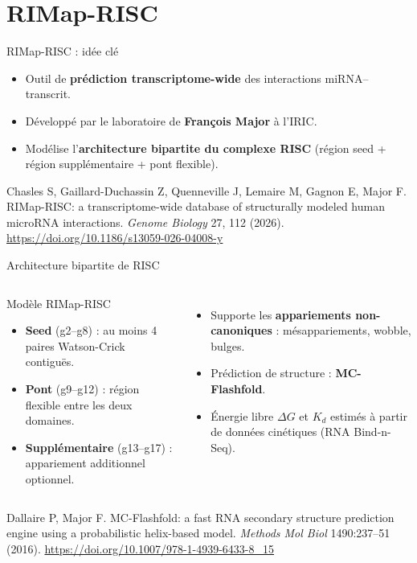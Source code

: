 \section{RIMap-RISC}

\begin{frame}{RIMap-RISC : idée clé}
  \vspace{2cm}
\begin{center}
\begin{minipage}{0.85\textwidth}
\begin{itemize}
	\item Outil de \textbf{prédiction transcriptome-wide} des interactions miRNA--transcrit.
	\item Développé par le laboratoire de \textbf{François Major} à l'IRIC.
	\item Modélise l'\textbf{architecture bipartite du complexe RISC}
	      (région seed + région supplémentaire + pont flexible).
\end{itemize}
\end{minipage}
\end{center}
\vfill
\scriptsize Chasles S, Gaillard-Duchassin Z, Quenneville J, Lemaire M, Gagnon E, Major F. RIMap-RISC: a transcriptome-wide database of structurally modeled human microRNA interactions. \textit{Genome Biology} 27, 112 (2026). \url{https://doi.org/10.1186/s13059-026-04008-y}
\end{frame}

\begin{frame}{Architecture bipartite de RISC}
\begin{columns}[T, onlytextwidth]
	\begin{block}{Modèle RIMap-RISC}
		\begin{itemize}
			\item \textbf{Seed} (g2--g8) : au moins 4 paires Watson-Crick contiguës.
			\item \textbf{Pont} (g9--g12) : région flexible entre les deux domaines.
			\item \textbf{Supplémentaire} (g13--g17) : appariement additionnel optionnel.
		\end{itemize}
	\end{block}

	\vspace{0.5em}
	\begin{itemize}
		\item Supporte les \textbf{appariements non-canoniques} : mésappariements, wobble, bulges.
		\item Prédiction de structure : \textbf{MC-Flashfold}.
		\item Énergie libre $\Delta G$ et $K_d$ estimés à partir de données cinétiques (RNA Bind-n-Seq).
	\end{itemize}
\end{columns}
\vfill
\scriptsize Dallaire P, Major F. MC-Flashfold: a fast RNA secondary structure prediction engine using a probabilistic helix-based model. \textit{Methods Mol Biol} 1490:237--51 (2016). \url{https://doi.org/10.1007/978-1-4939-6433-8_15}
\end{frame}

